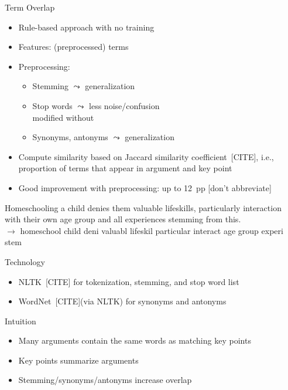 \documentclass[english,handout]{mlutalk}
\newcommand{\todocite}{{\smaller\color{red}[CITE]}\xspace}
\newcommand{\todo}[1]{{\smaller\color{red}[#1]}}
\begin{document}
\begin{frame}[allowframebreaks]{Term Overlap}
  
  \begin{itemize}
    \item Rule-based approach with no training
    \item Features: (preprocessed) terms
    \item Preprocessing:
    \begin{itemize}
      \item Stemming \(\leadsto\) generalization
      \item Stop words \(\leadsto\) less noise/confusion \\ modified without 
      \item Synonyms, antonyms \(\leadsto\) generalization
    \end{itemize}
    \item Compute similarity based on Jaccard similarity coefficient~\todocite, i.e., proportion of terms that appear in argument and key point
    \item Good improvement with preprocessing: up to 12~pp \todo{don't abbreviate}
  \end{itemize}
  
  \begin{example}[Preprocessing]
    \smaller
    Homeschooling a child denies them valuable lifeskills, particularly interaction with their own age group and all experiences stemming from this. \\
    \(\to\) homeschool child deni valuabl lifeskil particular interact age group experi stem
  \end{example}

  \framebreak
  
  \begin{block}{Technology}
      \begin{itemize}
        \item NLTK~\todocite for tokenization, stemming,  and stop word list
        \item WordNet~\todocite (via NLTK) for synonyms and antonyms
      \end{itemize}
  \end{block}

  \begin{block}{Intuition}
    \begin{itemize}
      \item Many arguments contain the same words as matching key points
      \item Key points summarize arguments
      \item Stemming/synonyms/antonyms increase overlap
    \end{itemize}


\end{block}
\end{frame}
\end{document}
